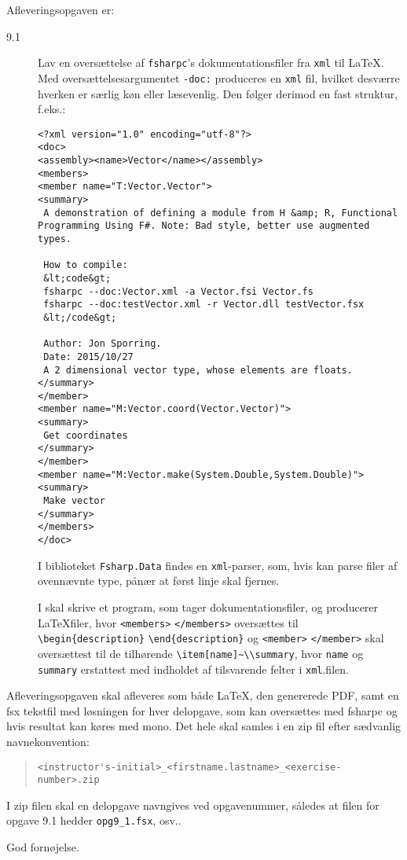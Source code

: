 \documentclass[a4paper,12pt]{article}
\begin{document}
Afleveringsopgaven er:
\begin{description}
\item[9.1] Lav en oversættelse af \lstinline|fsharpc|'s dokumentationsfiler fra \lstinline|xml| til \LaTeX. Med oversættelsesargumentet \lstinline|-doc:| produceres en \lstinline|xml| fil, hvilket desværre hverken er særlig køn eller læsevenlig. Den følger derimod en fast struktur, f.eks.:
\begin{lstlisting}
<?xml version="1.0" encoding="utf-8"?>
<doc>
<assembly><name>Vector</name></assembly>
<members>
<member name="T:Vector.Vector">
<summary>
 A demonstration of defining a module from H &amp; R, Functional Programming Using F#. Note: Bad style, better use augmented types.

 How to compile:
 &lt;code&gt;
 fsharpc --doc:Vector.xml -a Vector.fsi Vector.fs
 fsharpc --doc:testVector.xml -r Vector.dll testVector.fsx
 &lt;/code&gt;

 Author: Jon Sporring.
 Date: 2015/10/27
 A 2 dimensional vector type, whose elements are floats.
</summary>
</member>
<member name="M:Vector.coord(Vector.Vector)">
<summary>
 Get coordinates
</summary>
</member>
<member name="M:Vector.make(System.Double,System.Double)">
<summary>
 Make vector
</summary>
</members>
</doc>
\end{lstlisting}
I biblioteket \lstinline|Fsharp.Data| findes en \lstinline|xml|-parser, som, hvis kan parse filer af ovennævnte type, pånær at først linje skal fjernes.

I skal skrive et program, som tager dokumentationsfiler, og producerer \LaTeX filer, hvor \lstinline|<members>| \lstinline|</members>| oversættes til \lstinline|\begin{description}| \lstinline|\end{description}| og \lstinline|<member>| \lstinline|</member>| skal oversættest til de tilhørende \lstinline|\item[name]~\\summary|, hvor \lstinline|name| og \lstinline|summary| erstattest med indholdet af tilsvarende felter i \lstinline|xml|.filen.
\end{description}
Afleveringsopgaven skal afleveres som både LaTeX, den genererede PDF, samt en fsx tekstfil med løsningen for hver delopgave, som kan oversættes med fsharpc og hvis resultat kan køres med mono. Det hele skal samles i en zip fil efter sædvanlig navnekonvention:
\begin{quote}
  \lstinline|<instructor's-initial>_<firstname.lastname>_<exercise-number>.zip|
\end{quote}
I zip filen skal en delopgave navngives ved opgavenummer, således at
filen for opgave 9.1 hedder \lstinline|opg9_1.fsx|, osv..

\flushright God fornøjelse.
\end{document}
